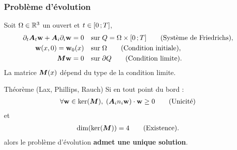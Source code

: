 \begin{frame}
\frametitle{Problème d'évolution}
\vfill
Soit $\Omega \in \mathbb{R}^{3}$ un ouvert et $t \in \lbrack0\,;T\rbrack$,
\begin{align*}
	\partial_{t} \bm{A}_{t} \bm{\mathrm{w}} + {\bm{A}_{i}\partial_{i}} \bm{\mathrm{w}} = 0
	&\quad \mathrm{sur} \; Q = \Omega \times \lbrack0\,;T\rbrack
	\tag{Système de Friedrichs} , \\
	\bm{\mathrm{w}} (x, 0) = \bm{\mathrm{w}}_0 (x)
	&\quad \mathrm{sur} \; \Omega
	\tag{Condition initiale} , \\
	 \bm{M} \bm{\mathrm{w}} = 0
	&\quad \mathrm{sur} \; \partial Q
	\tag{Condition limite} .
\end{align*}
\vfill
La matrice $\bm{M}(x)$ dépend du type de la condition limite.
\vfill
\begin{block}{Théorème (Lax, Phillips, Rauch)}
	Si en tout point du bord :
	\begin{align*}
		\forall \bm{\mathrm{w}} \in \ker(\bm{M}), \; ({\bm{A}_{i}n_{i}} \bm{\mathrm{w}}) \cdot \bm{\mathrm{w}} \ge 0
		\tag{Unicité}
	\end{align*}
	et
	\begin{align*}
		\dim(\ker(\bm{M})) = 4
		\tag{Existence} .
	\end{align*}
	alors le problème d'évolution \textbf{admet une
		unique solution}.
\end{block}
\vfill
\end{frame}

